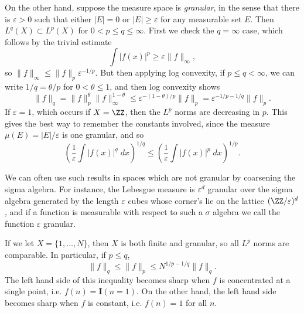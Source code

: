 \begin{example}
  On the other hand, suppose the measure space is {\it granular}, in the sense that there is $\varepsilon > 0$ such that either $|E| = 0$ or $|E| \geq \varepsilon$ for any measurable set $E$. Then $L^q(X) \subset L^p(X)$ for $0 < p \leq q \leq \infty$. First we check the $q = \infty$ case, which follows by the trivial estimate
  \[ \int |f(x)|^p \geq \varepsilon \| f \|_\infty, \]
  so $\| f \|_\infty \leq \| f \|_p \varepsilon^{-1/p}$. But then applying log convexity, if $p \leq q < \infty$, we can write $1/q = \theta/p$ for $0 < \theta \leq 1$, and then log convexity shows
  \[ \| f \|_q = \| f \|_p^\theta \| f \|_\infty^{1-\theta} \leq \varepsilon^{-(1 - \theta)/p} \| f \|_p = \varepsilon^{-1/p - 1/q} \| f \|_p. \]
  If $\varepsilon = 1$, which occurs if $X = \ZZ$, then the $L^p$ norms are decreasing in $p$. This gives the best way to remember the constants involved, since the measure $\mu(E) = |E|/\varepsilon$ is one granular, and so
  \[ \left( \frac{1}{\varepsilon} \int |f(x)|^q\; dx \right)^{1/q} \leq \left( \frac{1}{\varepsilon} \int |f(x)|^p\; dx \right)^{1/p}. \]
\end{example}

  

\begin{remark}
  We can often use such results in spaces which are not granular by coarsening the sigma algebra. For instance, the Lebesgue measure is $\varepsilon^d$ granular over the sigma algebra generated by the length $\varepsilon$ cubes whose corner's lie on the lattice $(\ZZ/\varepsilon)^d$, and if a function is measurable with respect to such a $\sigma$ algebra we call the function $\varepsilon$ granular.
\end{remark}

\begin{remark}
  If we let $X = \{ 1, \dots, N \}$, then $X$ is both finite and granular, so all $L^p$ norms are comparable. In particular, if $p \leq q$,
  \[ \| f \|_q \leq \| f \|_p \leq N^{1/p - 1/q} \| f \|_q. \]
  The left hand side of this inequality becomes sharp when $f$ is concentrated at a single point, i.e. $f(n) = \mathbf{I}(n = 1)$. On the other hand, the left hand side becomes sharp when $f$ is constant, i.e. $f(n) = 1$ for all $n$.
\end{remark}

